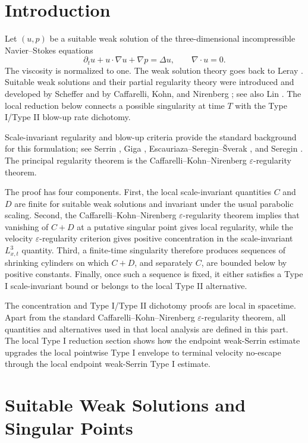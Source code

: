 \documentclass[11pt]{amsart}
\theoremstyle{plain}
\theoremstyle{definition}
\theoremstyle{remark}
\numberwithin{equation}{section}
\begin{document}
\section{Introduction}

Let \((u,p)\) be a suitable weak solution of the three-dimensional
incompressible Navier--Stokes equations
\[
  \partial_t u+u\cdot\nabla u+\nabla p=\Delta u,
  \qquad \nabla\cdot u=0.
\]
The viscosity is normalized to one.  The weak
solution theory goes back to Leray \cite{Leray1934}.  Suitable weak solutions
and their partial regularity theory were introduced and developed by Scheffer
\cite{Scheffer1976} and by Caffarelli, Kohn, and Nirenberg \cite{CKN1982}; see
also Lin \cite{Lin1998}.  The local reduction below connects a possible
singularity at time \(T\) with the Type I/Type II blow-up rate dichotomy.

Scale-invariant regularity and blow-up criteria provide the standard background
for this formulation; see Serrin \cite{Serrin1962}, Giga \cite{Giga1986},
Escauriaza--Seregin--{\v S}verak \cite{ESS2003}, and Seregin
\cite{Seregin2012}.  The principal regularity theorem is the
Caffarelli--Kohn--Nirenberg \(\varepsilon\)-regularity theorem.

The proof has four components.  First, the local scale-invariant
quantities \(C\) and \(D\) are finite for suitable weak solutions and invariant
under the usual parabolic scaling.  Second, the Caffarelli--Kohn--Nirenberg
\(\varepsilon\)-regularity theorem implies that vanishing of \(C+D\) at a
putative singular point gives local regularity, while the velocity
\(\varepsilon\)-regularity criterion gives positive concentration in the
scale-invariant \(L^3_{x,t}\) quantity.  Third, a finite-time singularity
therefore produces sequences of shrinking cylinders on which \(C+D\), and
separately \(C\), are bounded below by positive constants.  Finally, once such
a sequence is fixed, it either satisfies a Type I scale-invariant bound or
belongs to the local Type II alternative.

The concentration and Type I/Type II dichotomy proofs are local in
spacetime.  Apart from the standard Caffarelli--Kohn--Nirenberg
\(\varepsilon\)-regularity theorem, all quantities and alternatives used in
that local analysis are defined in this part.  The local Type I reduction section
shows how the endpoint weak-Serrin estimate upgrades the local pointwise Type I
envelope to terminal velocity no-escape through the local endpoint weak-Serrin
Type I estimate.

\section{Suitable Weak Solutions and Singular Points}
\end{document}
